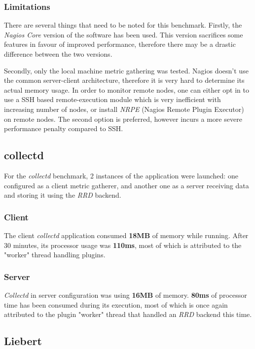         \subsubsection{Limitations}
            There are several things that need to be noted for this benchmark. Firstly, the \textit{Nagios Core} version of the software has been used. This version sacrifices some features in favour of improved performance, therefore there may be a drastic difference between the two versions.
            
            Secondly, only the local machine metric gathering was tested. Nagios doesn't use the common server-client architecture, therefore it is very hard to determine its actual memory usage. In order to monitor remote nodes, one can either opt in to use a SSH based remote-execution module which is very inefficient with increasing number of nodes, or install \textit{NRPE} (Nagios Remote Plugin Executor) on remote nodes. The second option is preferred, however incurs a more severe performance penalty compared to SSH.
    
            
    \subsection{collectd}
        For the \textit{collectd} benchmark, 2 instances of the application were launched: one configured as a client metric gatherer, and another one as a server receiving data and storing it using the \textit{RRD} backend. 
        
        \subsubsection{Client}
            The client \textit{collectd} application consumed \textbf{18MB} of memory while running. After 30 minutes, its processor usage was \textbf{110ms}, most of which is attributed to the "worker" thread handling plugins.
            
        \subsubsection{Server}
            \textit{Collectd} in server configuration was using \textbf{16MB} of memory. \textbf{80ms} of processor time has been consumed during its execution, most of which is once again attributed to the plugin "worker" thread that handled an \textit{RRD} backend this time.
    
    
    \subsection{Liebert}
